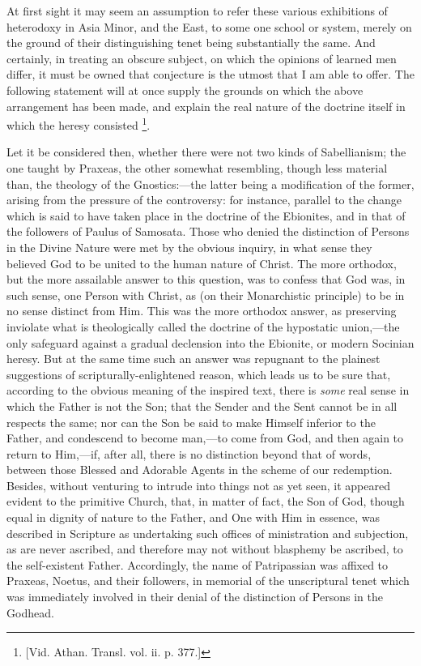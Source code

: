 At first sight it may seem an assumption to refer these various
exhibitions of heterodoxy in Asia Minor, and the East, to some
one school or system, merely on the ground of their distinguishing
tenet being substantially the same. And certainly, in treating an
obscure subject, on which the opinions of learned men differ, it must
be owned that conjecture is the utmost that I am able to offer. The
following statement will at once supply the grounds on which the above
arrangement has been made, and explain the real nature of the doctrine
itself in which the heresy consisted \footnote{[Vid. Athan. Transl. vol. ii. p. 377.]}.

Let it be considered then, whether there were not two kinds of
Sabellianism; the one taught by Praxeas, the other somewhat
resembling, though less material than, the theology of the Gnostics:—the
latter being a modification of the former, arising from the pressure
of the controversy: for instance, parallel to the change which is said
to have taken place in the doctrine of the Ebionites, and in that of
the followers of Paulus of Samosata. Those who denied the distinction
of Persons in the Divine Nature were met by the obvious inquiry, in
what sense they believed God to be united to the human nature of
Christ. The more orthodox, but the more assailable answer to this
question, was to confess that God was, in such sense, one Person with
Christ, as (on their Monarchistic principle) to be in no sense
distinct from Him. This was the more orthodox answer, as preserving
inviolate what is theologically called the doctrine of the hypostatic
union,—the only safeguard against a gradual declension into the
Ebionite, or modern Socinian heresy. But at the same time such an
answer was repugnant to the plainest suggestions of scripturally-enlightened
reason, which leads us to be sure that, according to the obvious
meaning of the inspired text, there is \emph{some} real sense in which
the Father is not the Son; that the Sender and the Sent cannot be in
all respects the same; nor can the Son be said to make Himself
inferior to the Father, and condescend to become man,—to come from
God, and then again to return to Him,—if, after all, there is no
distinction beyond that of words, between those Blessed and Adorable
Agents in the scheme of our redemption. Besides, without venturing to
intrude into things not as yet seen, it appeared evident to the
primitive Church, that, in matter of fact, the Son of God, though
equal in dignity of nature to the Father, and One with Him in essence,
was described in Scripture as undertaking such offices of ministration
and subjection, as are never ascribed, and therefore may not without
blasphemy be ascribed, to the self-existent Father. Accordingly, the
name of Patripassian was affixed to Praxeas, Noetus, and their
followers, in memorial of the unscriptural tenet which was immediately
involved in their denial of the distinction of Persons in the Godhead.

